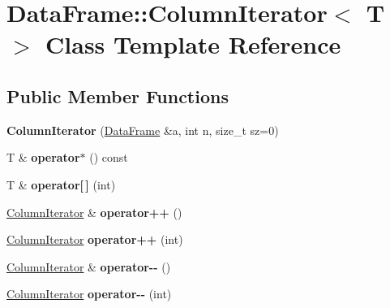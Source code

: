 \hypertarget{classDataFrame_1_1ColumnIterator}{}\section{Data\+Frame\+:\+:Column\+Iterator$<$ T $>$ Class Template Reference}
\label{classDataFrame_1_1ColumnIterator}
\subsection*{Public Member Functions}
\begin{DoxyCompactItemize}
\item 
\mbox{\label{classDataFrame_1_1ColumnIterator_acfbf7a899ff3c6db441e36f10c652d4c}} 
{\bfseries Column\+Iterator} (\hyperlink{classDataFrame}{Data\+Frame} \&a, int n, size\+\_\+t sz=0)
\item 
\mbox{\label{classDataFrame_1_1ColumnIterator_ae0ed020c832499ccce268ac495ce39c0}} 
T \& {\bfseries operator$\ast$} () const
\item 
\mbox{\label{classDataFrame_1_1ColumnIterator_aa76fd764e2b1814221ca35857aa55e51}} 
T \& {\bfseries operator\mbox{[}$\,$\mbox{]}} (int)
\item 
\mbox{\label{classDataFrame_1_1ColumnIterator_a3b21d2d4e0d21791b01f40dc69b0935a}} 
\hyperlink{classDataFrame_1_1ColumnIterator}{Column\+Iterator} \& {\bfseries operator++} ()
\item 
\mbox{\label{classDataFrame_1_1ColumnIterator_ab6b12782f41c8b37b2e86726c570d713}} 
\hyperlink{classDataFrame_1_1ColumnIterator}{Column\+Iterator} {\bfseries operator++} (int)
\item 
\mbox{\label{classDataFrame_1_1ColumnIterator_a890a43be71c7d138e2364ecc69ec13f5}} 
\hyperlink{classDataFrame_1_1ColumnIterator}{Column\+Iterator} \& {\bfseries operator-\/-\/} ()
\item 
\mbox{\label{classDataFrame_1_1ColumnIterator_a369bd7ee30e3a41e60dd3a6e832c9519}} 
\hyperlink{classDataFrame_1_1ColumnIterator}{Column\+Iterator} {\bfseries operator-\/-\/} (int)
\end{DoxyCompactItemize}
